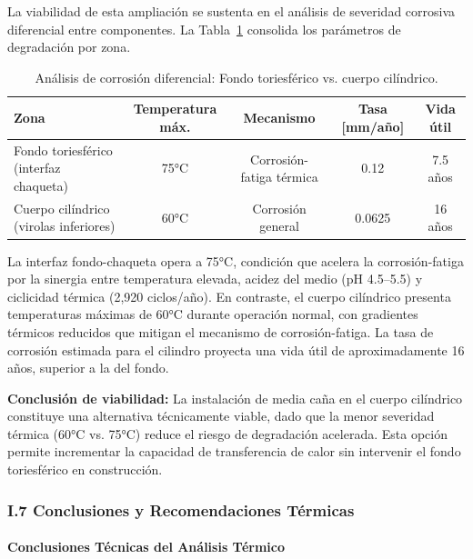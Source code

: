 La viabilidad de esta ampliación se sustenta en el análisis de severidad corrosiva diferencial entre componentes. La Tabla~\ref{tab:resumen_corrosion_diferencial} consolida los parámetros de degradación por zona.

\begin{table}[H]
\centering
\caption{Análisis de corrosión diferencial: Fondo toriesférico vs. cuerpo cilíndrico.}
\label{tab:resumen_corrosion_diferencial}
\setcounter{itemcount}{0}
\begin{tabularx}{\textwidth}{@{}Xcccc@{}}
\toprule
\textbf{Zona} & \textbf{Temperatura máx.} & \textbf{Mecanismo} & \textbf{Tasa [mm/año]} & \textbf{Vida útil} \\
\midrule
Fondo toriesférico (interfaz chaqueta) & 75°C & Corrosión-fatiga térmica & 0.12 & 7.5 años \\
Cuerpo cilíndrico (virolas inferiores) & 60°C & Corrosión general & 0.0625 & 16 años \\
\bottomrule
\end{tabularx}
\end{table}

La interfaz fondo-chaqueta opera a 75°C, condición que acelera la corrosión-fatiga por la sinergia entre temperatura elevada, acidez del medio (pH 4.5--5.5) y ciclicidad térmica (2,920 ciclos/año). En contraste, el cuerpo cilíndrico presenta temperaturas máximas de 60°C durante operación normal, con gradientes térmicos reducidos que mitigan el mecanismo de corrosión-fatiga. La tasa de corrosión estimada para el cilindro proyecta una vida útil de aproximadamente 16 años, superior a la del fondo.

\textbf{Conclusión de viabilidad:} La instalación de media caña en el cuerpo cilíndrico constituye una alternativa técnicamente viable, dado que la menor severidad térmica (60°C vs. 75°C) reduce el riesgo de degradación acelerada. Esta opción permite incrementar la capacidad de transferencia de calor sin intervenir el fondo toriesférico en construcción.

\subsubsection*{I.7 Conclusiones y Recomendaciones Térmicas}

\paragraph{Conclusiones Técnicas del Análisis Térmico}

